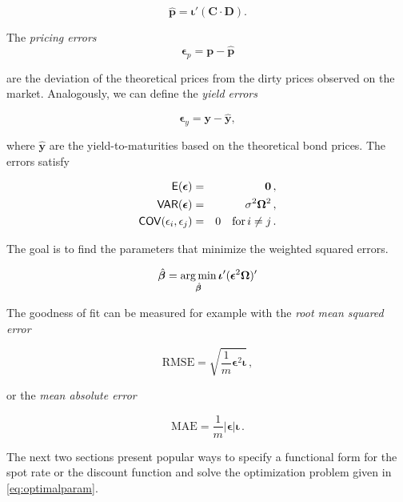\begin{equation}
  \label{eq:theorprices}
  \bm{\hat{p}} = \bm{\iota}'(\bm{C}\cdot\bm{D}).
\end{equation}



The \emph{pricing errors}
\begin{equation*}
  \label{eq:pricingerrors}
  \bm{\epsilon}_p = \bm{p-\hat{p}}
\end{equation*}

are the deviation of the theoretical prices from the dirty prices observed on the market. Analogously, we can define the \emph{yield errors}


\begin{equation*}
  \label{eq:yielderrors}
  \bm{\epsilon}_y = \bm{y-\hat{y}},
\end{equation*}

where $\hat{\bm{y}}$ are the yield-to-maturities based on the theoretical bond prices. The errors satisfy

\begin{eqnarray*}
  \label{eq:residuals}
  \mathsf{E}(\bm{\epsilon}) &=& \bm{0}\,,\\
  \mathsf{VAR}(\bm{\epsilon}) &=&\sigma^2\bm{\Omega}^2\,,\\
  \mathsf{COV}(\epsilon_i, \epsilon_j) &=& 0 \quad \mbox{for}\,i\neq j\, .
\end{eqnarray*}

The goal is to find the parameters that minimize the weighted squared errors.


\begin{equation}
  \label{eq:optimalparam}
  \hat{\bm{\beta}}= \operatorname*{arg\,min}_{\hat{\bm{\beta}}}\bm{\iota}'(\bm{\epsilon}^2\bm{\Omega})'
\end{equation}

The goodness of fit can be measured for example with the \emph{root mean squared error}

\begin{equation*}
  \label{eq:rmse}
  \mbox{RMSE}=\sqrt{\frac{1}{m}\bm{\epsilon}^2\bm{\iota}}\,,
\end{equation*}

or the \emph{mean absolute error}

\begin{equation*}
  \label{eq:mae}
  \mbox{MAE}=\frac{1}{m}|\bm{\epsilon}|\bm{\iota}\,.
\end{equation*}

The next two sections present popular ways to specify a functional form for the spot rate or the discount function and solve the optimization problem given in \eqref{eq:optimalparam}.


